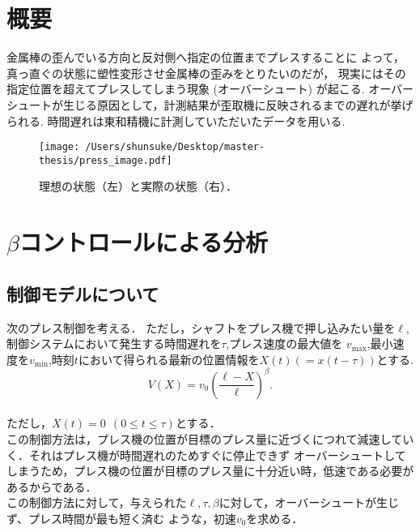 \documentclass [dvipdfmx] {jsarticle}
\numberwithin{equation}{section}
\theoremstyle{definition} %
\theoremstyle{definition} %
\begin{document}
\section{概要}
金属棒の歪んでいる方向と反対側へ指定の位置までプレスすることに
よって，真っ直ぐの状態に塑性変形させ金属棒の歪みをとりたいのだが，
現実にはその指定位置を超えてプレスしてしまう現象 (オーバーシュート) が起こる.
オーバーシュートが生じる原因として，計測結果が歪取機に反映されるまでの遅れが挙げられる.
時間遅れは東和精機に計測していただいたデータを用いる.
\begin{figure}[hbt]
    \centering
    \texttt{[image: /Users/shunsuke/Desktop/master-thesis/press\_image.pdf]}
    \caption{理想の状態（左）と実際の状態（右）．}
    \label{Sample p.1}
\end{figure}
\newpage


\section{$\beta$コントロールによる分析}
\subsection{制御モデルについて}
次のプレス制御を考える．
ただし，シャフトをプレス機で押し込みたい量を$\ell$,制御システムにおいて発生する時間遅れを$\tau$,プレス速度の最大値を
$v_{\max}$,最小速度を$v_{\min}$,時刻$t$において得られる最新の位置情報を$X(t)(=x(t-\tau))$とする.
\begin{equation}\label{eq:betamodel}
    V(X)=v_0\left(\frac{\ell-X}{\ell}\right)^\beta.
\end{equation}
\\ただし，$X(t)=0\ \ (0\le t\le\tau)$とする．
\\
この制御方法は，プレス機の位置が目標のプレス量に近づくにつれて減速していく．それはプレス機が時間遅れのためすぐに停止できず
オーバーシュートしてしまうため，プレス機の位置が目標のプレス量に十分近い時，低速である必要があるからである．\\
この制御方法に対して，与えられた$\ell,\tau,\beta$に対して，オーバーシュートが生じず、プレス時間が最も短く済む
ような，初速$v_0$を求める．

\end{document}
